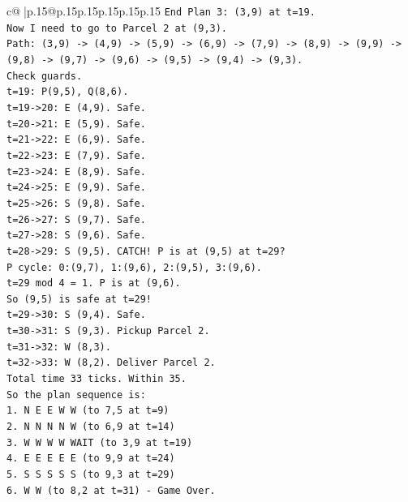 \documentclass{article}
\begin{document}
{\begin{supertabular}{c@{$\;$}|p{.15\linewidth}@{}p{.15\linewidth}p{.15\linewidth}p{.15\linewidth}p{.15\linewidth}p{.15\linewidth}}
{{{\texttt{End Plan 3: (3,9) at t=19.} \\
\texttt{Now I need to go to Parcel 2 at (9,3).} \\
\texttt{Path: (3,9) {-}> (4,9) {-}> (5,9) {-}> (6,9) {-}> (7,9) {-}> (8,9) {-}> (9,9) {-}> (9,8) {-}> (9,7) {-}> (9,6) {-}> (9,5) {-}> (9,4) {-}> (9,3).} \\
\texttt{Check guards.} \\
\texttt{t=19: P(9,5), Q(8,6).} \\
\texttt{t=19{-}>20: E (4,9). Safe.} \\
\texttt{t=20{-}>21: E (5,9). Safe.} \\
\texttt{t=21{-}>22: E (6,9). Safe.} \\
\texttt{t=22{-}>23: E (7,9). Safe.} \\
\texttt{t=23{-}>24: E (8,9). Safe.} \\
\texttt{t=24{-}>25: E (9,9). Safe.} \\
\texttt{t=25{-}>26: S (9,8). Safe.} \\
\texttt{t=26{-}>27: S (9,7). Safe.} \\
\texttt{t=27{-}>28: S (9,6). Safe.} \\
\texttt{t=28{-}>29: S (9,5). CATCH! P is at (9,5) at t=29?} \\
\texttt{P cycle: 0:(9,7), 1:(9,6), 2:(9,5), 3:(9,6).} \\
\texttt{t=29 mod 4 = 1. P is at (9,6).} \\
\texttt{So (9,5) is safe at t=29!} \\
\texttt{t=29{-}>30: S (9,4). Safe.} \\
\texttt{t=30{-}>31: S (9,3). Pickup Parcel 2.} \\
\texttt{t=31{-}>32: W (8,3).} \\
\texttt{t=32{-}>33: W (8,2). Deliver Parcel 2.} \\
\texttt{Total time 33 ticks. Within 35.} \\
\texttt{So the plan sequence is:} \\
\texttt{1. N E E W W (to 7,5 at t=9)} \\
\texttt{2. N N N N W (to 6,9 at t=14)} \\
\texttt{3. W W W W WAIT (to 3,9 at t=19)} \\
\texttt{4. E E E E E (to 9,9 at t=24)} \\
\texttt{5. S S S S S (to 9,3 at t=29)} \\
\texttt{6. W W (to 8,2 at t=31) {-} Game Over.} \\
\\ 
}}}
\end{supertabular}}
\end{document}
